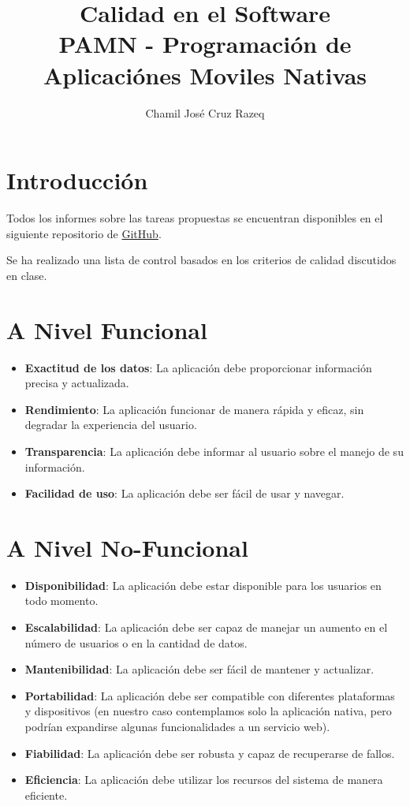 \documentclass{article}
\title{Calidad en el Software \\[3ex] \small PAMN - Programación de Aplicaciónes Moviles Nativas}
\author{Chamil José Cruz Razeq}
\begin{document}
    \maketitle
    \thispagestyle{empty}
    \newpage

    \section{Introducción}
        Todos los informes sobre las tareas propuestas se encuentran disponibles en el
         siguiente repositorio de \href{https://github.com/chamilstudy/ulpgc_pamn_assigments}{GitHub}.

        Se ha realizado una lista de control basados en los criterios de calidad discutidos en clase.
    
    \section{A Nivel Funcional}

    \begin{itemize}
        \item \textbf{Exactitud de los datos}: La aplicación debe proporcionar información precisa y actualizada.
        \item \textbf{Rendimiento}: La aplicación funcionar de manera rápida y eficaz, sin degradar la experiencia del usuario.
        \item \textbf{Transparencia}: La aplicación debe informar al usuario sobre el manejo de su información.
        \item \textbf{Facilidad de uso}: La aplicación debe ser fácil de usar y navegar.
    \end{itemize}

    \section{A Nivel No-Funcional}

    \begin{itemize}
        \item \textbf{Disponibilidad}: La aplicación debe estar disponible para los usuarios en todo momento.
        \item \textbf{Escalabilidad}: La aplicación debe ser capaz de manejar un aumento en el número de usuarios o en la cantidad de datos.
        \item \textbf{Mantenibilidad}: La aplicación debe ser fácil de mantener y actualizar.
        \item \textbf{Portabilidad}: La aplicación debe ser compatible con diferentes plataformas y dispositivos (en nuestro caso contemplamos solo
            la aplicación nativa, pero podrían expandirse algunas funcionalidades a un servicio web).
        \item \textbf{Fiabilidad}: La aplicación debe ser robusta y capaz de recuperarse de fallos.
        \item \textbf{Eficiencia}: La aplicación debe utilizar los recursos del sistema de manera eficiente.
    \end{itemize}
        
\end{document}
